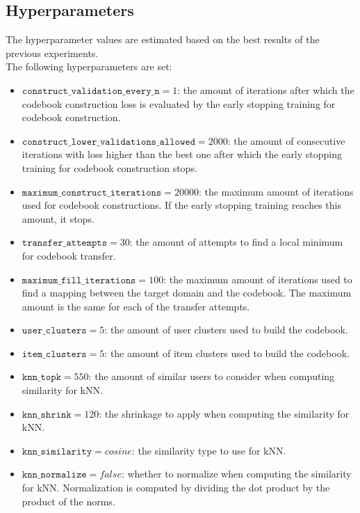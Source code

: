 \subsection{Hyperparameters}

The hyperparameter values are estimated based on the best results of the previous experiments.\\
The following hyperparameters are set:
\begin{itemize}
\item $\texttt{construct\_validation\_every\_n} = 1$: the amount of iterations after which the codebook construction loss is evaluated by the early stopping training for codebook construction.
\item $\texttt{construct\_lower\_validations\_allowed} = 2000$: the amount of consecutive iterations with loss higher than the best one after which the early stopping training for codebook construction stops.
\item $\texttt{maximum\_construct\_iterations} = 20000$: the maximum amount of iterations used for codebook constructions. If the early stopping training reaches this amount, it stops.
\item $\texttt{transfer\_attempts} = 30$: the amount of attempts to find a local minimum for codebook transfer.
\item $\texttt{maximum\_fill\_iterations} = 100$: the maximum amount of iterations used to find a mapping between the target domain and the codebook. The maximum amount is the same for each of the transfer attempts.
\item $\texttt{user\_clusters} = 5$: the amount of user clusters used to build the codebook.
\item $\texttt{item\_clusters} = 5$: the amount of item clusters used to build the codebook.
\item $\texttt{knn\_topk} = 550$: the amount of similar users to consider when computing similarity for kNN.
\item $\texttt{knn\_shrink} = 120$: the shrinkage to apply when computing the similarity for kNN.
\item $\texttt{knn\_similarity} = cosine$: the similarity type to use for kNN.
\item $\texttt{knn\_normalize} = false$: whether to normalize when computing the similarity for kNN. Normalization is computed by dividing the dot product by the product of the norms.
\end{itemize}



